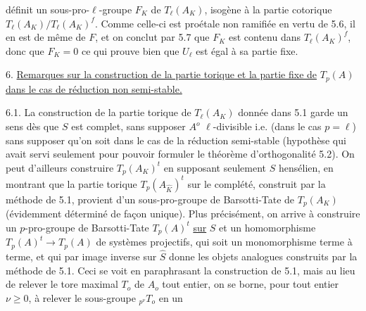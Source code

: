 
définit un sous-pro-$\ell$-groupe $F_K$ de $T_\ell(A_K)$, isogène à la partie cotorique $T_\ell(A_K)/T_\ell(A_K)^f$. Comme celle-ci est proétale non ramifiée en vertu de 5.6, il en est de même de $F$, et on conclut par 5.7 que $F_K$ est contenu dans $T_\ell(A_K)^f$, donc que $F_K = 0$ ce qui prouve bien que $U_\ell$ est égal à sa partie fixe.


6. \underline{Remarques sur la construction de la partie torique et la partie fixe de} $T_p(A)$ \underline{dans le cas de réduction non semi-stable.}

6.1. La construction de la partie torique de $T_\ell(A_K)$ donnée dans 5.1 garde un sens dès que $S$ est complet, sans supposer $A^o$ $\ell$-divisible i.e. (dans le cas $p = \ell$) sans supposer qu'on soit dans le cas de la réduction semi-stable (hypothèse qui avait servi seulement pour pouvoir formuler le théorème d'orthogonalité 5.2). On peut d'ailleurs construire $T_p(A_K)^t$ en supposant seulement $S$ hensélien, en montrant que la partie torique $T_p(A_{\hat{K}})^t$ sur le complété, construit par la méthode de 5.1, provient d'un sous-pro-groupe de Barsotti-Tate de $T_p(A_K)$ (évidemment déterminé de façon unique). Plus précisément, on arrive à construire un $p$-pro-groupe de Barsotti-Tate $T_p(A)^t$ \underline{sur} $S$ et un homomorphisme $T_p(A)^t \longrightarrow T_p(A)$ de systèmes projectifs, qui soit un monomorphisme terme à terme, et qui par image inverse sur $\hat{S}$ donne les objets analogues construits par la méthode de 5.1. Ceci se voit en paraphrasant la construction de 5.1, mais au lieu de relever le tore maximal $T_o$ de $A_o$ tout entier, on se borne, pour tout entier $\nu \geq 0$, à relever le sous-groupe ${}_{p^\nu}T_o$ en un




